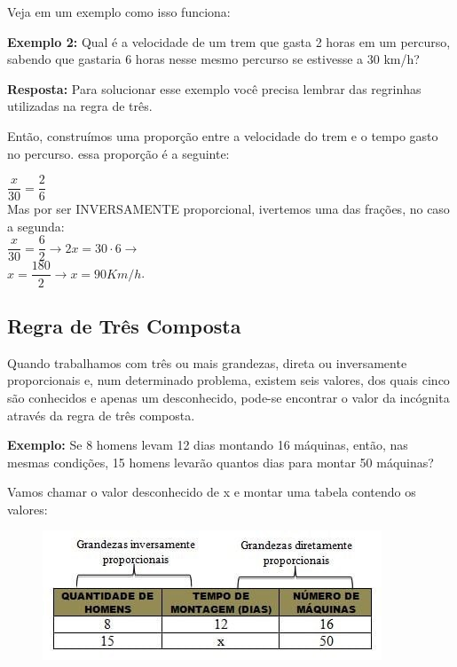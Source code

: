 \begin{multicols*}{2}
	Veja em um exemplo como isso funciona:

	\textbf{Exemplo 2:} Qual é a velocidade de um trem que gasta 2 horas em um percurso, sabendo que gastaria 6 horas nesse mesmo percurso se estivesse a 30 km/h?

	\textbf{Resposta:} Para solucionar esse exemplo você precisa lembrar das regrinhas utilizadas na regra de três.

	Então, construímos uma proporção entre a velocidade do trem e o tempo gasto no percurso. essa proporção é a seguinte:

	{$ \dfrac{x}{30} = \dfrac{2}{6} $}\\

	Mas por ser INVERSAMENTE proporcional, ivertemos uma das frações, no caso a segunda:\\

	{$ \dfrac{x}{30} = \dfrac{6}{2} \to 2x = 30\cdot 6 \to$}\\

	{$ x = \dfrac{180}{2} \to x = 90 Km/h$}.

	\subsection*{Regra de Três Composta}

	Quando trabalhamos com três ou mais grandezas, direta ou inversamente proporcionais e, num determinado problema, existem seis valores, dos quais cinco são conhecidos e apenas um desconhecido, pode-se encontrar o valor da incógnita através da regra de três composta.

	\textbf{Exemplo:} Se 8 homens levam 12 dias montando 16 máquinas, então, nas mesmas condições, 15 homens levarão quantos dias para montar 50 máquinas?

	Vamos chamar o valor desconhecido de x e montar uma tabela contendo os valores:

	\begin{figure}[H]
		\centering
		\includegraphics[width=\columnwidth]{assets/R3composta.jpg}
	\end{figure}


\end{multicols*}
